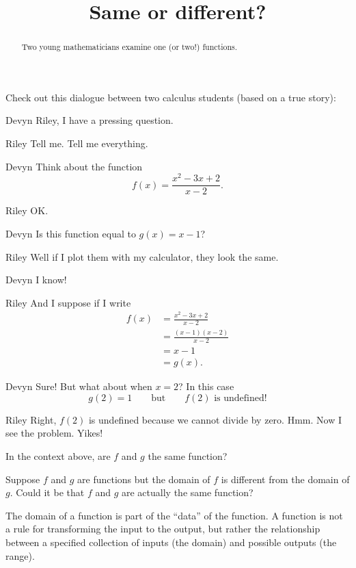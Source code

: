 \documentclass{ximera}
\title[Break-Ground:]{Same or different?}
\begin{document}
\begin{abstract}
  Two young mathematicians examine one (or two!)  functions.
\end{abstract}
\maketitle

Check out this dialogue between two calculus students (based on a true
story):

\begin{dialogue}
\item[Devyn] Riley, I have a pressing question.
\item[Riley] Tell me. Tell me everything.
\item[Devyn] Think about the function
  \[
  f(x) = \frac{x^2 - 3x + 2}{x-2}.
  \]
\item[Riley] OK.
\item[Devyn] Is this function equal to $g(x) = x-1$?
\item[Riley] Well if I plot them with my calculator, they look the
  same.
\item[Devyn] I know!
\item[Riley] And I suppose if I write
  \begin{align*}
    f(x) &= \frac{x^2 - 3x + 2}{x-2} \\
    &= \frac{(x-1)(x-2)}{x-2} \\
    &= x-1 \\
    &= g(x).
  \end{align*}
\item[Devyn] Sure! But what about when $x=2$? In this case
  \[
  g(2) = 1\qquad\text{but}\qquad f(2) \text{ is undefined!}
  \]
\item[Riley] Right, $f(2)$ is undefined because we cannot divide by
  zero. Hmm. Now I see the problem. Yikes!
\end{dialogue}

\begin{problem}
  In the context above, are $f$ and $g$ the same function?
  \begin{multipleChoice}
  \end{multipleChoice}
\end{problem}



\begin{problem}
  Suppose $f$ and $g$ are functions but the domain of $f$ is different
  from the domain of $g$.  Could it be that $f$ and $g$ are actually
  the same function?

  \begin{multipleChoice}
  \end{multipleChoice}

  \begin{feedback}
    The domain of a function is part of the ``data'' of the function.
    A function is not a rule for transforming the input to the output,
    but rather the relationship between a specified collection of
    inputs (the domain) and possible outputs (the range).
  \end{feedback}
\end{problem}
\end{document}
